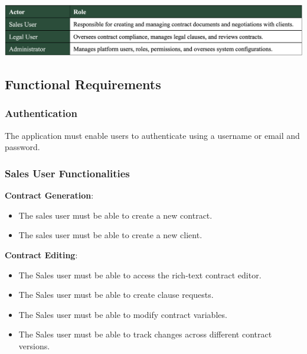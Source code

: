 \begin{center}
    \centering
    \includegraphics[width=1\textwidth]{Images/Actors and Their Roles.png}
    \label{tab:actors_and_roles}
\end{center}

\subsection{Functional Requirements}

\subsubsection{Authentication}
The application must enable users to authenticate using a username or email and password.

\subsubsection{Sales User Functionalities}

\textbf{Contract Generation}:\vspace{0.4em}
\begin{adjustwidth}{3em}{1em}
    \begin{itemize}
        \item The sales user must be able to create a new contract.\vspace{0.4em}
        \item The sales user must be able to create a new client.
    \end{itemize}
\end{adjustwidth}\vspace{0.85em}

\textbf{Contract Editing}:\vspace{0.4em}
\begin{adjustwidth}{3em}{1em}
    \begin{itemize}
        \item The Sales user must be able to access the rich-text contract editor.\vspace{0.4em}
        \item The Sales user must be able to create clause requests.\vspace{0.4em}
        \item The Sales user must be able to modify contract variables.\vspace{0.4em}
        \item The Sales user must be able to track changes across different contract versions.  
    \end{itemize}
\end{adjustwidth}\vspace{0.85em} 

